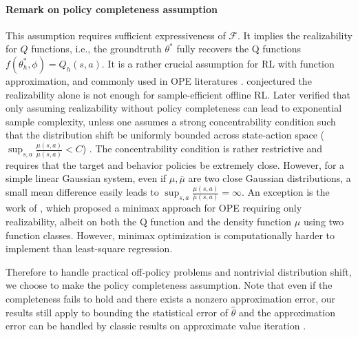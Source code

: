 \documentclass{article}
\def\mw#1{\textcolor{red}{mw:#1}}
\numberwithin{equation}{section}
\theoremstyle{plain}
\theoremstyle{definition}
\theoremstyle{remark}
\begin{document}
\paragraph{Remark on policy completeness assumption}%
This assumption requires sufficient expressiveness of $\mathcal{F}$. It implies the realizability for $Q$ functions, i.e., the groundtruth $\theta^*$ fully recovers the Q functions $f(\theta_h^*,\phi) = Q_h(s,a).$ 
It is a rather crucial assumption for RL with function approximation, and commonly used in OPE literatures \citep{bootstrap, duan2020minimax, le2019batch,hao2021sparse,fan2020theoretical}. \citep{chen2019information} conjectured the realizability alone is not enough for sample-efficient offline RL. Later \citep{wang2020statistical} verified that only assuming realizability without policy completeness can lead to exponential sample complexity, unless one assumes a strong concentrability condition such that the distribution shift be uniformly bounded across state-action space ($\sup_{s,a} \frac{\mu(s,a)}{\bar \mu(s,a)} < C$) \citep{munos2008finite,farahmand2016regularized,le2019batch}. The concentrability condition is rather restrictive and requires that the target and behavior policies be extremely close. However, for a simple linear Gaussian system, even if  $\mu,\bar\mu$ are two close Gaussian distributions,  a small mean difference easily leads to $\sup_{s,a} \frac{\mu(s,a)}{\bar \mu(s,a)} = \infty.$ An exception is the work of \citep{uehara2020minimax}, which proposed a minimax approach for OPE requiring only realizability, albeit on both the Q function and the density function $\mu$ using two function classes. However, minimax optimization is computationally harder to implement than least-square regression. 

Therefore to handle practical off-policy problems and nontrivial distribution shift, we choose to make the policy completeness assumption. 
Note that even if the completeness fails to hold and there exists a nonzero approximation error, our results still apply to bounding the statistical error of $\hat \theta$ and the approximation error can be handled by classic results on approximate value iteration \citep{szepesvari2005finite}. 
\end{document}
